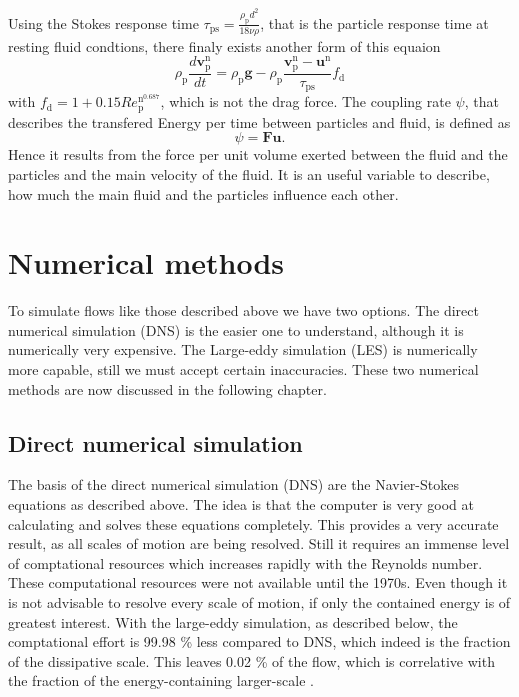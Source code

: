 \documentclass[11pt,a4paper,openany,oneside,parskip=half*]{article}
\renewcommand*\vec[1]{\boldsymbol{#1}}
\begin{document}
Using the Stokes response time $\tau_\mathrm{ps} = \frac{\rho_\mathrm{p}d^2}{18\nu\rho}$, that is the particle response time at resting fluid condtions, there finaly exists another form of this equaion 
\begin{equation}
\rho_\mathrm{p}\frac{d\vec{v}_\mathrm{p}^\mathrm{n}}{dt} = \rho_\mathrm{p}\vec{g}-\rho_\mathrm{p}\frac{\vec{v}_\mathrm{p}^\mathrm{n}-\vec{u}^\mathrm{n}}{\tau_\mathrm{ps}}f_\mathrm{d}
\end{equation}
with $f_\mathrm{d} = 1+0.15Re_\mathrm{p}^\mathrm{n^{0.687}}$, which is not the drag force.
\newline
{}
\nomenclature{$\vec{x}_\mathrm{p}$}{Particle position}
\nomenclature{$\vec{v}_\mathrm{p}$}{Particle velocity}
The coupling rate $\psi$, that describes the transfered Energy per time between particles and fluid, is defined as
\begin{equation}
\psi = \vec{F} \vec{u}. 
\end{equation}
Hence it results from the force per unit volume exerted between the fluid and the particles and the main velocity of the fluid.
It is an useful variable to describe, how much the main fluid and the particles influence each other.

 
 \pagebreak
\section{Numerical methods} %
To simulate flows like those described above we have two options. The direct numerical simulation (DNS) is the easier one to understand, although it is numerically very expensive. The Large-eddy simulation (LES) is numerically more capable, still we must accept certain inaccuracies. These two numerical methods are now discussed in the following chapter.
\subsection{Direct numerical simulation}
The basis of the direct numerical simulation (DNS) are the Navier-Stokes equations as described above. The idea is that the computer is very good at calculating and solves these equations completely. This provides a very accurate result, as all scales of motion are being resolved. Still it requires an immense level of comptational resources which increases rapidly with the Reynolds number. These computational resources were not available until the 1970s. Even though it is not advisable to resolve every scale of motion, if only the contained energy is of greatest interest. With the large-eddy simulation, as described below, the comptational effort is 99.98 \% less compared to DNS, which indeed is the fraction of the dissipative scale. This leaves 0.02 \% of the flow, which is correlative with the fraction of the energy-containing larger-scale \cite{turbulentFlows}.%
\end{document}
